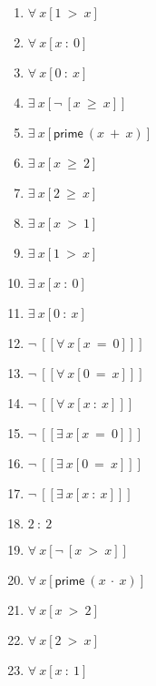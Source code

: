 \documentclass{article}
\begin{document}
\begin{enumerate}
\item $\forall \ x[1 \ > \ x]$

\item $\forall \ x[x \ : \ 0]$

\item $\forall \ x[0 \ : \ x]$

\item $\exists \ x[\neg \ [x \ \ge \ x]]$

\item $\exists \ x[\mathsf{prime} \ (x \ + \ x)]$

\item $\exists \ x[x \ \ge \ 2]$

\item $\exists \ x[2 \ \ge \ x]$

\item $\exists \ x[x \ > \ 1]$

\item $\exists \ x[1 \ > \ x]$

\item $\exists \ x[x \ : \ 0]$

\item $\exists \ x[0 \ : \ x]$

\item $\neg \ [[\forall \ x[x \ = \ 0]]]$

\item $\neg \ [[\forall \ x[0 \ = \ x]]]$

\item $\neg \ [[\forall \ x[x \ : \ x]]]$

\item $\neg \ [[\exists \ x[x \ = \ 0]]]$

\item $\neg \ [[\exists \ x[0 \ = \ x]]]$

\item $\neg \ [[\exists \ x[x \ : \ x]]]$

\item $2 \ : \ 2$

\item $\forall \ x[\neg \ [x \ > \ x]]$

\item $\forall \ x[\mathsf{prime} \ (x \ \cdot \ x)]$

\item $\forall \ x[x \ > \ 2]$

\item $\forall \ x[2 \ > \ x]$

\item $\forall \ x[x \ : \ 1]$


\end{enumerate}
\end{document}
